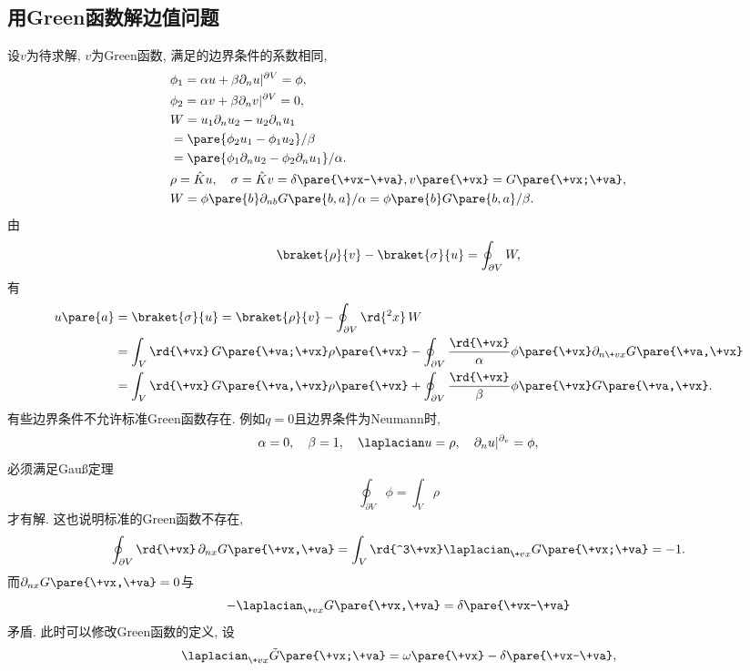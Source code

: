 \documentclass[hidelinks]{ctexart}
\begin{document}

\subsection{用Green函数解边值问题} %
\label{sub:用green函数解边值问题}

\newpoint{}设$v$为待求解, $v$为Green函数, 满足的边界条件的系数相同,
\begin{align*}
    & \phi_1 = \alpha u + \beta \partial_n u\vert^{\partial V} = \phi, \\
    & \phi_2 = \alpha v + \beta \partial_n v\vert^{\partial V} = 0, \\
    & W = u_1 \partial_n u_2 - u_2 \partial_n u_1 \\
    & = \pare{\phi_2 u_1 - \phi_1 u_2}/\beta \\
    & = \pare{\phi_1 \partial_n u_2 - \phi_2 \partial_n u_1}/\alpha. \\
    & \rho = \hat K u,\quad \sigma = \hat K v = \delta\pare{\+vx-\+va}, v\pare{\+vx} = G\pare{\+vx;\+va}, \\
    & W = \phi\pare{b} \partial_{nb} G\pare{b,a}/\alpha = \phi\pare{b}G\pare{b,a}/\beta.
\end{align*}
\newpoint{}由
\[ \braket{\rho}{v} - \braket{\sigma}{u} = \oint_{\partial V}W, \]
有
\begin{align*}
    u\pare{a} &= \braket{\sigma}{u} = \braket{\rho}{v} - \oint_{\partial V}\rd{^2x}\, W \\
    &= \int_V \rd{\+vx}\, G\pare{\+va;\+vx}\rho\pare{\+vx} - \oint_{\partial V} \frac{\rd{\+vx}}{\alpha}\phi\pare{\+vx}\partial_{n\+vx}G\pare{\+va,\+vx} \\
    &= \int_V \rd{\+vx}\,G\pare{\+va,\+vx}\rho\pare{\+vx} + \oint_{\partial V} \frac{\rd{\+vx}}{\beta}\phi\pare{\+vx}G\pare{\+va,\+vx}.
\end{align*}
\newpoint{}有些边界条件不允许标准Green函数存在.
\newpoint{}例如$q=0$且边界条件为Neumann时,
\[ \alpha = 0,\quad \beta = 1,\quad \laplacian u = \rho,\quad \partial_n u\vert^{\partial_v} = \phi, \]
必须满足Gau\ss 定理
\[ \oint_{\partial V}\phi = \int_V \rho \]
才有解. 这也说明标准的Green函数不存在,
\[ \oint_{\partial V}\rd{\+vx}\,\partial_{nx}G\pare{\+vx,\+va} = \int_V \rd{^3\+vx}\laplacian_{\+vx}G\pare{\+vx;\+va} = -1. \]
而$\partial_{nx}G\pare{\+vx,\+va} = 0$与
\[ -\laplacian_{\+vx}G\pare{\+vx,\+va} = \delta\pare{\+vx-\+va} \]
矛盾.
\newpoint{}此时可以修改Green函数的定义, 设
\[ \laplacian_{\+vx} \tilde{G}\pare{\+vx;\+va} = \omega\pare{\+vx} - \delta\pare{\+vx-\+va}, \]
\end{document}
